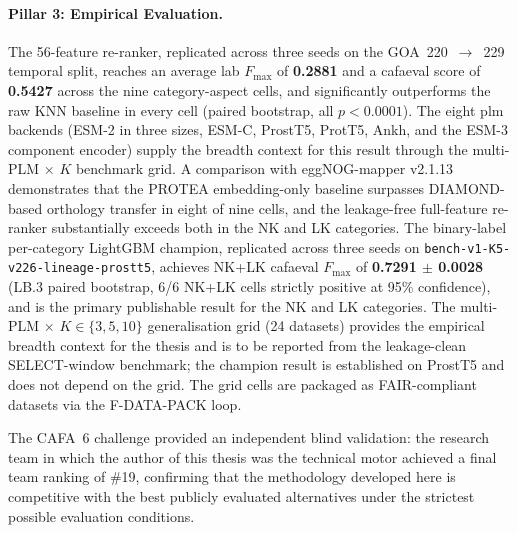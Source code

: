 \paragraph{Pillar 3: Empirical Evaluation.}

The 56-feature re-ranker, replicated across three seeds on the GOA~220~$\to$~229
temporal split, reaches an average lab $F_{\max}$ of \textbf{0.2881} and a
cafaeval score of \textbf{0.5427} across the nine category-aspect cells, and
significantly outperforms the raw KNN baseline in every cell (paired bootstrap,
all $p < 0.0001$). The eight \gls{plm} backends (ESM-2 in three sizes, ESM-C,
ProstT5, ProtT5, Ankh, and the ESM-3 component encoder) supply the breadth
context for this result through the multi-PLM $\times$ $K$ benchmark grid. A comparison with
eggNOG-mapper v2.1.13 demonstrates that the PROTEA embedding-only baseline
surpasses DIAMOND-based orthology transfer in eight of nine cells, and the
leakage-free full-feature re-ranker substantially exceeds both in the NK and LK
categories. The binary-label per-category LightGBM champion, replicated across
three seeds on \texttt{bench-v1-K5-v226-lineage-prostt5}, achieves
NK+LK cafaeval $F_{\max}$ of \textbf{0.7291 $\pm$ 0.0028}
(LB.3 paired bootstrap, 6/6 NK+LK cells strictly positive at 95\%
confidence), and is the primary publishable result for the NK and LK
categories. The multi-PLM $\times$ $K \in \{3,5,10\}$ generalisation grid
(24 datasets) provides the empirical breadth context for the thesis and is to
be reported from the leakage-clean SELECT-window benchmark; the champion result
is established on ProstT5 and does not depend on the grid. The grid cells are
packaged as FAIR-compliant datasets via the F-DATA-PACK loop.

The CAFA~6 challenge provided an independent blind validation: the research
team in which the author of this thesis was the technical motor achieved a
final team ranking of \#19, confirming that the methodology developed here is
competitive with the best publicly evaluated alternatives under the strictest
possible evaluation conditions.

